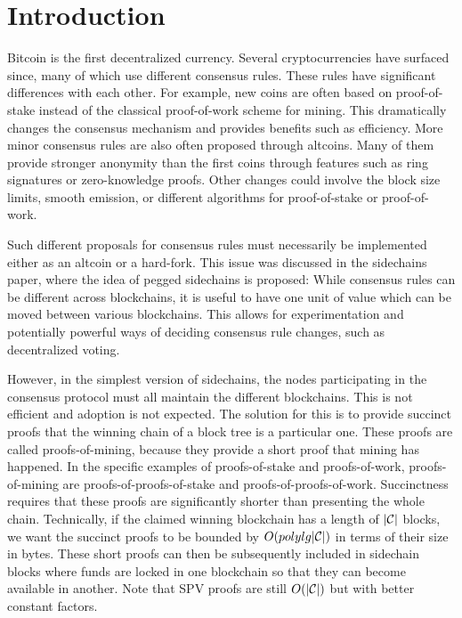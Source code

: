 \section{Introduction}

Bitcoin \cite{bitcoin} is the first decentralized currency. Several
cryptocurrencies have surfaced since, many of which use different consensus
rules. These rules have significant differences with each other. For example,
new coins are often based on proof-of-stake instead of the classical
proof-of-work scheme for mining. This dramatically changes the consensus
mechanism and provides benefits such as efficiency. More minor consensus rules
are also often proposed through altcoins. Many of them provide stronger
anonymity than the first coins through features such as ring signatures or
zero-knowledge proofs. Other changes could involve the block size limits,
smooth emission, or different algorithms for proof-of-stake or proof-of-work.

Such different proposals for consensus rules must necessarily be implemented
either as an altcoin or a hard-fork. This issue was discussed in the sidechains
paper, where the idea of pegged sidechains is proposed: While consensus rules
can be different across blockchains, it is useful to have one unit of value
which can be moved between various blockchains. This allows for experimentation
and potentially powerful ways of deciding consensus rule changes, such as
decentralized voting.

However, in the simplest version of sidechains, the nodes participating in the
consensus protocol must all maintain the different blockchains. This is not
efficient and adoption is not expected. The solution for this is to provide
succinct proofs that the winning chain of a block tree is a particular one.
These proofs are called proofs-of-mining, because they provide a short proof
that mining has happened. In the specific examples of proofs-of-stake and
proofs-of-work, proofs-of-mining are proofs-of-proofs-of-stake and
proofs-of-proofs-of-work. Succinctness requires that these proofs are
significantly shorter than presenting the whole chain. Technically, if the
claimed winning blockchain has a length of $|\mathcal{C}|$ blocks, we want the succinct
proofs to be bounded by $O(polylg|\mathcal{C}|)$ in terms of their size in bytes.
These short proofs can then be subsequently included in sidechain blocks where
funds are locked in one blockchain so that they can become available in
another. Note that SPV proofs are still $O(|\mathcal{C}|)$ but with better constant
factors.

